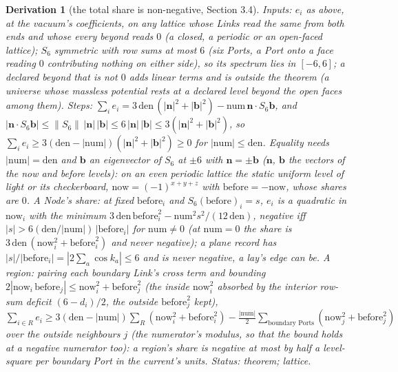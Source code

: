 \documentclass[pdflatex,sn-mathphys-num]{sn-jnl}
\newcommand{\num}{\mathrm{num}}
\newcommand{\den}{\mathrm{den}}
\theoremstyle{thmstyleone}
\newtheorem{derivation}{Derivation}
\begin{document}
\begin{derivation}[the total share is non-negative, Section 3.4]
\emph{Inputs:} $e_i$ as above, at the vacuum's coefficients, on any lattice whose Links read the same from both ends and whose every beyond reads $0$ (a closed, a periodic or an open-faced lattice); $S_6$ symmetric with row sums at most $6$ (six Ports, a Port onto a face reading $0$ contributing nothing on either side), so its spectrum lies in $[-6, 6]$; a declared beyond that is not $0$ adds linear terms and is outside the theorem (a universe whose massless potential rests at a declared level beyond the open faces among them). \emph{Steps:} $\sum_i e_i = 3\,\den\,(|\mathbf n|^2 + |\mathbf b|^2) - \num\,\mathbf n \cdot S_6\mathbf b$, and $|\mathbf n \cdot S_6\mathbf b| \le \|S_6\|\,|\mathbf n|\,|\mathbf b| \le 6\,|\mathbf n|\,|\mathbf b| \le 3(|\mathbf n|^2 + |\mathbf b|^2)$, so $\sum_i e_i \ge 3(\den - |\num|)(|\mathbf n|^2 + |\mathbf b|^2) \ge 0$ for $|\num| \le \den$. Equality needs $|\num| = \den$ and $\mathbf b$ an eigenvector of $S_6$ at $\pm 6$ with $\mathbf n = \pm\mathbf b$ ($\mathbf n$, $\mathbf b$ the vectors of the now and before levels): on an even periodic lattice the static uniform level of light or its checkerboard, $\mathrm{now} = (-1)^{x + y + z}$ with $\mathrm{before} = -\mathrm{now}$, whose shares are $0$. \emph{A Node's share:} at fixed $\mathrm{before}_i$ and $S_6(\mathrm{before})_i = s$, $e_i$ is a quadratic in $\mathrm{now}_i$ with the minimum $3\,\den\,\mathrm{before}_i^2 - \num^2 s^2 / (12\,\den)$, negative iff $|s| > 6(\den / |\num|)\,|\mathrm{before}_i|$ for $\num \ne 0$ (at $\num = 0$ the share is $3\,\den\,(\mathrm{now}_i^2 + \mathrm{before}_i^2)$ and never negative); a plane record has $|s| / |\mathrm{before}_i| = |2\sum_a\cos k_a| \le 6$ and is never negative, a lay's edge can be. \emph{A region:} pairing each boundary Link's cross term and bounding $2|\mathrm{now}_i\,\mathrm{before}_j| \le \mathrm{now}_i^2 + \mathrm{before}_j^2$ (the inside $\mathrm{now}_i^2$ absorbed by the interior row-sum deficit $(6 - d_i) / 2$, the outside $\mathrm{before}_j^2$ kept), $\sum_{i \in R} e_i \ge 3(\den - |\num|)\sum_R(\mathrm{now}_i^2 + \mathrm{before}_i^2) - \frac{|\num|}{2}\sum_{\text{boundary Ports}}(\mathrm{now}_j^2 + \mathrm{before}_j^2)$ over the outside neighbours $j$ (the numerator's modulus, so that the bound holds at a negative numerator too): a region's share is negative at most by half a level-square per boundary Port in the current's units.
 \emph{Status:} theorem; lattice.
\end{derivation}
\end{document}
